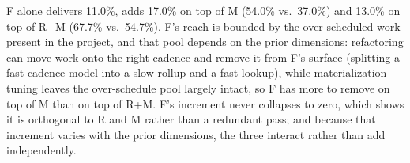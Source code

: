 


 F alone delivers 11.0\%, adds 17.0\% on top of M (54.0\% vs.\ 37.0\%) and 13.0\% on top of R+M (67.7\% vs.\ 54.7\%). F's reach is bounded by the over-scheduled work present in the project, and that pool depends on the prior dimensions: refactoring can move work onto the right cadence and remove it from F's surface (splitting a fast-cadence model into a slow rollup and a fast lookup), while materialization tuning leaves the over-schedule pool largely intact, so F has more to remove on top of M than on top of R+M. F's increment never collapses to zero, which shows it is orthogonal to R and M rather than a redundant pass; and because that increment varies with the prior dimensions, the three interact rather than add independently. 




